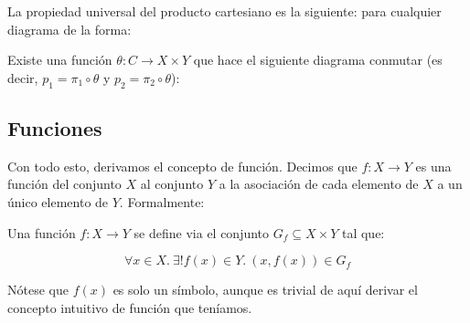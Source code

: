 \documentclass[10pt]{article}
\begin{document}
\begin{center}
\end{center}

La propiedad universal del producto cartesiano es la siguiente: para cualquier diagrama de la forma:

\begin{center}
\end{center}

Existe una función $ \theta : C \to X \times Y $ que hace el siguiente diagrama conmutar (es decir, $ p_1 = \pi_1 \circ \theta $ y  $ p_2 = \pi_2 \circ \theta $):

\begin{center}
\end{center}

\subsection{Funciones}

Con todo esto, derivamos el concepto de función. Decimos que $ f : X \to Y $ es una función del conjunto $ X $ al conjunto $ Y $ a la asociación de cada elemento de $ X $ a un único
elemento de $ Y $. Formalmente:

\begin{definition}[Función]
  Una función $f : X \to Y$ se define via el conjunto $G_f \subseteq X \times Y$ tal que:

  \[ \forall x \in X.\ \exists! f(x) \in Y.\ (x, f(x)) \in G_f \]

  Nótese que $ f(x) $ es solo un símbolo, aunque es trivial de aquí derivar el concepto intuitivo de función que teníamos.
\end{definition}
\end{document}

